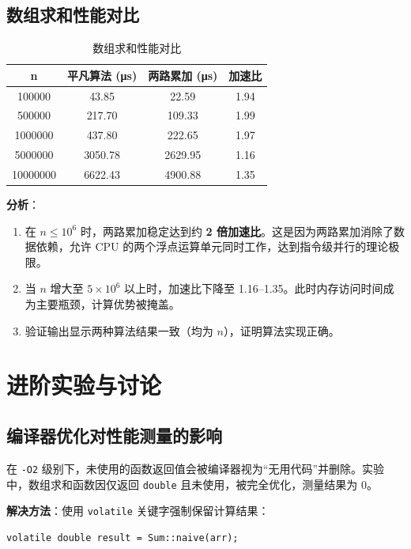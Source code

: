 \documentclass[11pt,a4paper]{article}
\begin{document}
\subsection{数组求和性能对比}

\begin{table}[h]
\centering
\caption{数组求和性能对比}
\begin{tabular}{|c|c|c|c|}
\hline
\textbf{n} & \textbf{平凡算法 (μs)} & \textbf{两路累加 (μs)} & \textbf{加速比} \\
\hline
100000 & 43.85 & 22.59 & 1.94 \\
\hline
500000 & 217.70 & 109.33 & 1.99 \\
\hline
1000000 & 437.80 & 222.65 & 1.97 \\
\hline
5000000 & 3050.78 & 2629.95 & 1.16 \\
\hline
10000000 & 6622.43 & 4900.88 & 1.35 \\
\hline
\end{tabular}
\end{table}

\textbf{分析}：
\begin{enumerate}
    \item 在 \(n \leq 10^6\) 时，两路累加稳定达到约 \textbf{2 倍加速比}。这是因为两路累加消除了数据依赖，允许 CPU 的两个浮点运算单元同时工作，达到指令级并行的理论极限。
    \item 当 \(n\) 增大至 \(5 \times 10^6\) 以上时，加速比下降至 1.16–1.35。此时内存访问时间成为主要瓶颈，计算优势被掩盖。
    \item 验证输出显示两种算法结果一致（均为 \(n\)），证明算法实现正确。
\end{enumerate}

\section{进阶实验与讨论}

\subsection{编译器优化对性能测量的影响}

在 \texttt{-O2} 级别下，未使用的函数返回值会被编译器视为“无用代码”并删除。实验中，数组求和函数因仅返回 \texttt{double} 且未使用，被完全优化，测量结果为 0。

\textbf{解决方法}：使用 \texttt{volatile} 关键字强制保留计算结果：
\begin{verbatim}
volatile double result = Sum::naive(arr);
\end{verbatim}
\end{document}

